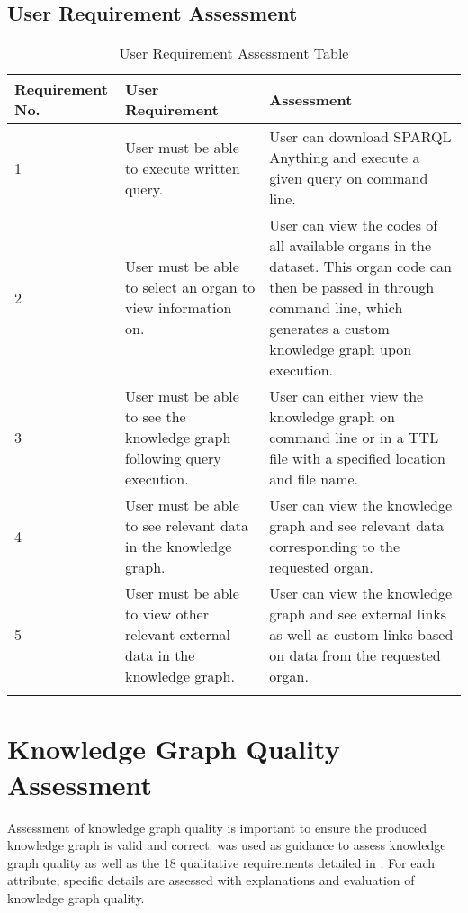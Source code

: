 \subsection{User Requirement Assessment}

\begin{longtable}{|p{2.25cm}|p{4.5cm}|p{6.5cm}|}
\hline
\textbf{Requirement No.} & \textbf{User Requirement} & \textbf{Assessment}\\
\hline

1& 
User must be able to execute written query. &
User can download SPARQL Anything \cite{sparqlanythinggithub} and execute a given query on command line. \\
\hline

2&
User must be able to select an organ to view information on. &
User can view the codes of all available organs in the dataset. This organ code can then be passed in through command line, which generates a custom knowledge graph upon execution. \\
\hline

3&
User must be able to see the knowledge graph following query execution. &
User can either view the knowledge graph on command line or in a TTL file with a specified location and file name. \\
\hline

4&
User must be able to see relevant data in the knowledge graph. &
User can view the knowledge graph and see relevant data corresponding to the requested organ. \\
\hline

5&
User must be able to view other relevant external data in the knowledge graph. &
User can view the knowledge graph and see external links as well as custom links based on data from the requested organ. \\ 
\hline

\caption{User Requirement Assessment Table}
\end{longtable}
\vspace{-1.1cm}

\section{Knowledge Graph Quality Assessment}
\hspace{0.5cm} Assessment of knowledge graph quality is important to ensure the produced knowledge graph is valid and correct. \cite{knowledgegraphevaulationbook} was used as guidance to assess knowledge graph quality as well as the 18 qualitative requirements detailed in \cite{evaluationpaper}. For each attribute, specific details are assessed with explanations and evaluation of knowledge graph quality. 

